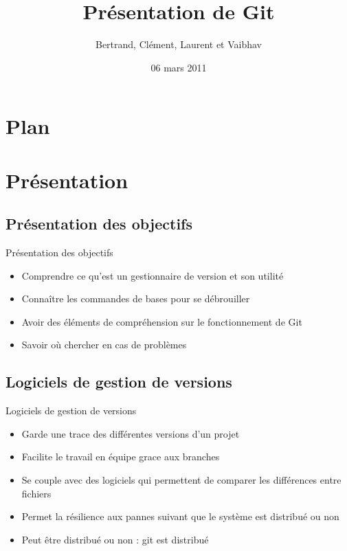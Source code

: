 \documentclass{beamer}
\title[ROSE]{Présentation de Git}
\author{Bertrand, Clément, Laurent et Vaibhav}
\institute{Télécom Paristech}
\date{06 mars 2011}
\begin{document}
\begin{frame}
\titlepage
\end{frame}

\section*{Plan}
%

\section{Présentation}
\subsection*{Présentation des objectifs}
\begin{frame}{Présentation des objectifs}
\begin{itemize}
\item Comprendre ce qu'est un gestionnaire de version et son utilité
\item Connaître les commandes de bases pour se débrouiller
\item Avoir des éléments de compréhension sur le fonctionnement de Git
\item Savoir où chercher en cas de problèmes
\end{itemize}
\end{frame}

\subsection*{Logiciels de gestion de versions}
\begin{frame}{Logiciels de gestion de versions}
  \begin{itemize}
    \item Garde une trace des différentes versions d'un projet 
    \item Facilite le travail en équipe grace aux branches 
    \item Se couple avec des logiciels qui permettent de comparer les différences entre fichiers 
    \item Permet la résilience aux pannes suivant que le système est distribué ou non
    \item Peut être distribué ou non : git est distribué 
  \end{itemize}
\end{frame}
\end{document}
